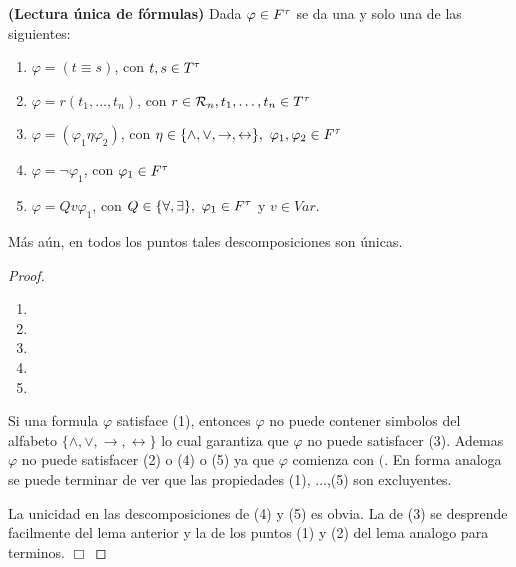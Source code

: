   \begin{theorem} \label{lemma_41}
    \PN \textbf{(Lectura única de fórmulas)} Dada $\varphi \in F^{\tau}$ se da una y solo una de las siguientes:
    \begin{enumerate}[(1)]
      \item $\varphi = (t \equiv s)$, con $t, s \in T^{\tau}$
      \item $\varphi = r(t_{1}, \dotsc, t_{n})$, con $r \in \mathcal{R}_{n}, t_{1}, \dotsc, t_{n} \in T^{\tau}$
      \item $\varphi = (\varphi_{1} \eta \varphi_{2})$, con $\eta \in \{\wedge, \vee, \rightarrow, \leftrightarrow\}, \
        \varphi_{1}, \varphi_{2} \in F^{\tau}$
      \item $\varphi = \lnot \varphi_{1}$, con $\varphi_{1} \in F^{\tau}$
      \item $\varphi = Qv \varphi_{1}$, con $Q \in \{\forall, \exists\}, \ \varphi_{1} \in F^{\tau}$ y $v \in Var$.
    \end{enumerate}

    \PN Más aún, en todos los puntos tales descomposiciones son únicas.
  \end{theorem}
  \begin{proof}
    \begin{enumerate}[(1)]
      \item
      \item
      \item
      \item
      \item
    \end{enumerate}

    Si una formula $\varphi $ satisface (1), entonces $\varphi $ no puede contener simbolos del alfabeto $\{\wedge ,\vee,
    \rightarrow ,\leftrightarrow \}$ lo cual garantiza que $\varphi $ no puede satisfacer (3). Ademas $ \varphi $ no
    puede satisfacer (2) o (4) o (5) ya que $\varphi $ comienza con $($. En forma analoga se puede terminar de ver que
    las propiedades (1), $\dotsc$,(5) son excluyentes.

    La unicidad en las descomposiciones de (4) y (5) es obvia. La de (3) se desprende facilmente del lema anterior y la de los puntos (1) y (2) del lema analogo para terminos. $\Box$
  \end{proof}

